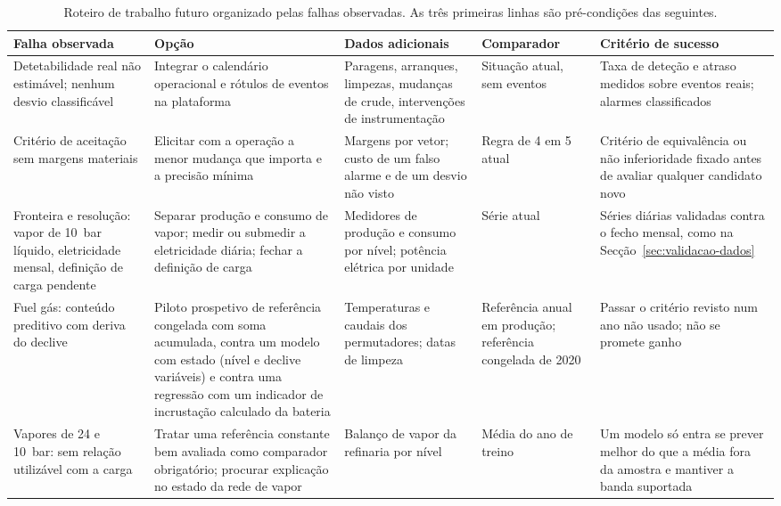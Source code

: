 \begin{table}[htbp]
  \centering\footnotesize
  \caption[Roteiro a partir das falhas observadas]{Roteiro de trabalho futuro
  organizado pelas falhas observadas. As três primeiras linhas são
  pré-condições das seguintes.}
  \label{tab:roteiro}
  \begin{tabularx}{\textwidth}{@{}>{\raggedright\arraybackslash}p{2.6cm}>{\raggedright\arraybackslash}X>{\raggedright\arraybackslash}p{2.6cm}>{\raggedright\arraybackslash}p{2.4cm}>{\raggedright\arraybackslash}X@{}}
    \toprule
    Falha observada & Opção & Dados adicionais & Comparador & Critério de sucesso \\
    \midrule
    Detetabilidade real não estimável; nenhum desvio classificável & Integrar o calendário operacional e rótulos de eventos na plataforma & Paragens, arranques, limpezas, mudanças de crude, intervenções de instrumentação & Situação atual, sem eventos & Taxa de deteção e atraso medidos sobre eventos reais; alarmes classificados \\
    \addlinespace
    Critério de aceitação sem margens materiais & Elicitar com a operação a menor mudança que importa e a precisão mínima & Margens por vetor; custo de um falso alarme e de um desvio não visto & Regra de 4 em 5 atual & Critério de equivalência ou não inferioridade fixado antes de avaliar qualquer candidato novo \\
    \addlinespace
    Fronteira e resolução: vapor de 10~bar líquido, eletricidade mensal, definição de carga pendente & Separar produção e consumo de vapor; medir ou submedir a eletricidade diária; fechar a definição de carga & Medidores de produção e consumo por nível; potência elétrica por unidade & Série atual & Séries diárias validadas contra o fecho mensal, como na Secção~\ref{sec:validacao-dados} \\
    \addlinespace
    Fuel gás: conteúdo preditivo com deriva do declive & Piloto prospetivo de referência congelada com soma acumulada, contra um modelo com estado (nível e declive variáveis) e contra uma regressão com um indicador de incrustação calculado da bateria & Temperaturas e caudais dos permutadores; datas de limpeza & Referência anual em produção; referência congelada de 2020 & Passar o critério revisto num ano não usado; não se promete ganho \\
    \addlinespace
    Vapores de 24 e 10~bar: sem relação utilizável com a carga & Tratar uma referência constante bem avaliada como comparador obrigatório; procurar explicação no estado da rede de vapor & Balanço de vapor da refinaria por nível & Média do ano de treino & Um modelo só entra se prever melhor do que a média fora da amostra e mantiver a banda suportada \\

\end{tabularx}
\end{table}
